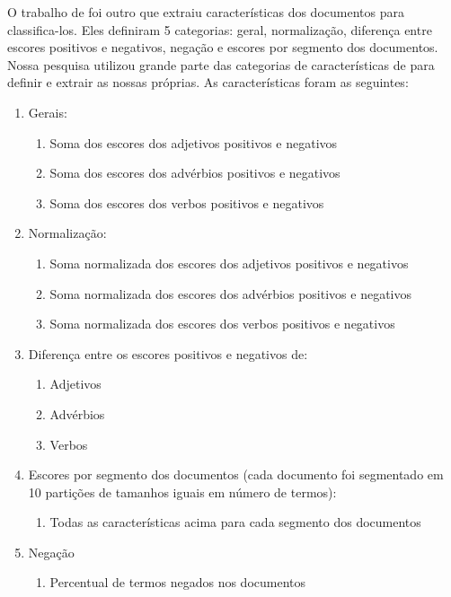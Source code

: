 \documentclass[template.tex]{subfiles}
\begin{document}
O trabalho de  foi outro que extraiu características dos documentos para classifica-los. Eles definiram 5 categorias: geral, normalização, diferença entre escores positivos e negativos, negação e escores por segmento dos documentos. Nossa pesquisa utilizou grande parte das categorias de características de  para definir e extrair as nossas próprias. As características foram as seguintes:
\begin{enumerate}
\item Gerais:
\begin{enumerate}
\item Soma dos escores dos adjetivos positivos e negativos
\item Soma dos escores dos advérbios positivos e negativos
\item Soma dos escores dos verbos positivos e negativos
\end{enumerate}
\item Normalização:
\begin{enumerate}
\item Soma normalizada dos escores dos adjetivos positivos e negativos
\item Soma normalizada dos escores dos advérbios positivos e negativos
\item Soma normalizada dos escores dos verbos positivos e negativos
\end{enumerate}
\item Diferença entre os escores positivos e negativos de:
\begin{enumerate}
\item Adjetivos
\item Advérbios
\item Verbos
\end{enumerate}
\item Escores por segmento dos documentos (cada documento foi segmentado em 10 partições de tamanhos iguais em número de termos):
\begin{enumerate}
\item Todas as características acima para cada segmento dos documentos
\end{enumerate}
\item Negação
\begin{enumerate}
\item Percentual de termos negados nos documentos
\end{enumerate}
\end{enumerate}
\end{document}

